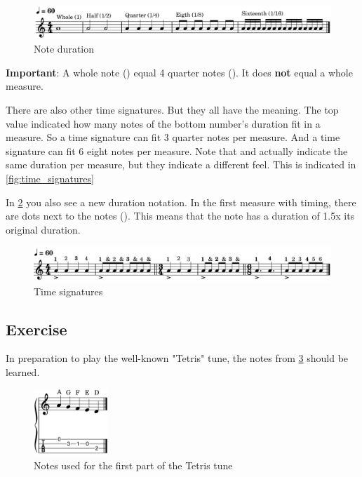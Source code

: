 \begin{figure}[h]
	\centering
	\includegraphics[width=\textwidth]{../MuseScore/Ukulele/MusicNotation/NoteDurations_Basic.png}
	\caption{Note duration}
	\label{fig:ukulele_note_duration_basic}
\end{figure}

\textbf{Important}: A whole note (\wholeNote) equal 4 quarter notes (\quarterNote). It does \textbf{not} equal a whole measure. \newline

There are also other time signatures. But they all have the meaning. The top value indicated how many notes of the bottom number's duration fit in a measure. So a  time signature can fit 3 quarter notes per measure. And a  time signature can fit 6 eight notes per measure. Note that  and  actually indicate the same duration per measure, but they indicate a different feel. This is indicated in \ref{fig:time_signatures}

In \ref{fig:ukulele_time_signatures} you also see a new duration notation. In the first measure with  timing, there are dots next to the notes (\quarterNoteDottedDown). This means that the note has a duration of 1.5x its original duration.

\begin{figure}[h]
	\centering
	\includegraphics[width=\textwidth]{../MuseScore/Ukulele/MusicNotation/TimeSignature.png}
	\caption{Time signatures}
	\label{fig:ukulele_time_signatures}
\end{figure}

\newpage

\subsection{Exercise}

In preparation to play the well-known "Tetris" tune, the notes from \ref{fig:ukulele_notes_for_tetris_first_part} should be learned.

\begin{figure}[h]
	\centering
	\includegraphics[width=0.25\textwidth]{../MuseScore/Ukulele/UkuleleNotesUsedInTetrisFirstPart.png}
	\caption{Notes used for the first part of the Tetris tune}
	\label{fig:ukulele_notes_for_tetris_first_part}
\end{figure}


